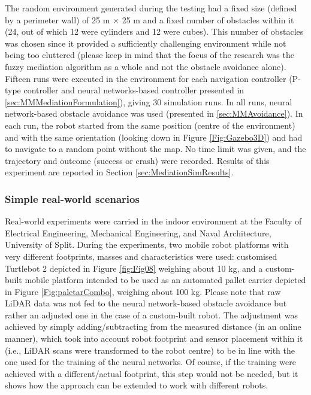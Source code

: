 The random environment generated during the testing had a fixed size (defined by a perimeter wall) of 25 m $\times$ 25 m and a fixed number of obstacles within it (24, out of which 12 were cylinders and 12 were cubes). This number of obstacles was chosen since it provided a sufficiently challenging environment while not being too cluttered (please keep in mind that the focus of the research was the fuzzy mediation algorithm as a whole and not the obstacle avoidance alone). Fifteen runs were executed in the environment for each navigation controller (P-type controller and neural networks-based controller presented in \cref{sec:MMMediationFormulation}), giving 30 simulation runs. In all runs, neural network-based obstacle avoidance was used (presented in \cref{sec:MMAvoidance}). In each run, the robot started from the same position (centre of the environment) and with the same orientation (looking down in Figure \ref{Fig:Gazebo3D}) and had to navigate to a random point without the map. No time limit was given, and the trajectory and outcome (success or crash) were recorded. Results of this experiment are reported in Section \ref{sec:MediationSimResults}.

\subsubsection{Simple real-world scenarios} \label{sec:MediationReal}
Real-world experiments were carried in the indoor environment at the Faculty of Electrical Engineering, Mechanical Engineering, and Naval Architecture, University of Split. During the experiments, two mobile robot platforms with very different footprints, masses and characteristics were used: customised Turtlebot 2 depicted in Figure \ref{fig:Fig08} weighing about 10 kg, and a custom-built mobile platform intended to be used as an automated pallet carrier depicted in Figure \ref{Fig:paletarCombo}, weighing about 100 kg. Please note that raw LiDAR data was not fed to the neural network-based obstacle avoidance but rather an adjusted one in the case of a custom-built robot. The adjustment was achieved by simply adding/subtracting from the measured distance (in an online manner), which took into account robot footprint and sensor placement within it (i.e., LiDAR scans were transformed to the robot centre) to be in line with the one used for the training of the neural networks. Of course, if the training were achieved with a different/actual footprint, this step would not be needed, but it shows how the approach can be extended to work with different robots.


